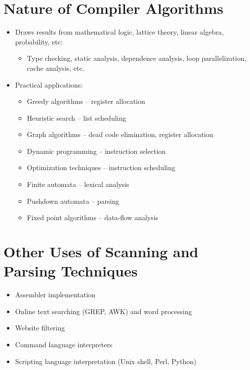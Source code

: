 \documentclass[a4paper,12pt]{article}
\begin{document}
\section{Nature of Compiler Algorithms}
\begin{itemize}[leftmargin=1.5em]
    \item Draws results from mathematical logic, lattice theory, linear algebra, probability, etc:
    \begin{itemize}
        \item Type checking, static analysis, dependence analysis, loop parallelization, cache analysis, etc.
    \end{itemize}
    \item Practical applications:
    \begin{itemize}
        \item Greedy algorithms – register allocation
        \item Heuristic search – list scheduling
        \item Graph algorithms – dead code elimination, register allocation
        \item Dynamic programming – instruction selection
        \item Optimization techniques – instruction scheduling
        \item Finite automata – lexical analysis
        \item Pushdown automata – parsing
        \item Fixed point algorithms – data-flow analysis
    \end{itemize}
\end{itemize}

\section{Other Uses of Scanning and Parsing Techniques}
\begin{itemize}[leftmargin=1.5em]
    \item Assembler implementation
    \item Online text searching (GREP, AWK) and word processing
    \item Website filtering
    \item Command language interpreters
    \item Scripting language interpretation (Unix shell, Perl, Python)
\end{itemize}
\end{document}
